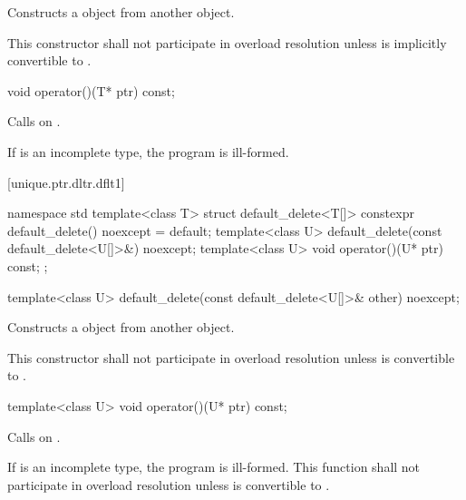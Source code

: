 \begin{itemdescr}
\pnum
\effects Constructs a  object
from another  object.

\pnum
\remarks This constructor shall not participate in overload resolution unless
 is implicitly convertible to .
\end{itemdescr}

%
\begin{itemdecl}
void operator()(T* ptr) const;
\end{itemdecl}

\begin{itemdescr}
\pnum
\effects Calls  on .

\pnum
\remarks If  is an incomplete type, the program is ill-formed.
\end{itemdescr}

[unique.ptr.dltr.dflt1]{}

\begin{codeblock}
namespace std {
  template<class T> struct default_delete<T[]> {
    constexpr default_delete() noexcept = default;
    template<class U> default_delete(const default_delete<U[]>&) noexcept;
    template<class U> void operator()(U* ptr) const;
  };
}
\end{codeblock}

\begin{itemdecl}
template<class U> default_delete(const default_delete<U[]>& other) noexcept;
\end{itemdecl}

\begin{itemdescr}
\pnum
\effects
Constructs a  object from another  object.

\pnum
\remarks
This constructor shall not participate in overload resolution unless  is
convertible to .
\end{itemdescr}

%
\begin{itemdecl}
template<class U> void operator()(U* ptr) const;
\end{itemdecl}

\begin{itemdescr}
\pnum
\effects
Calls  on .

\pnum
\remarks If  is an incomplete type, the program is ill-formed.
This function shall not participate in overload resolution
unless  is convertible to .
\end{itemdescr}

